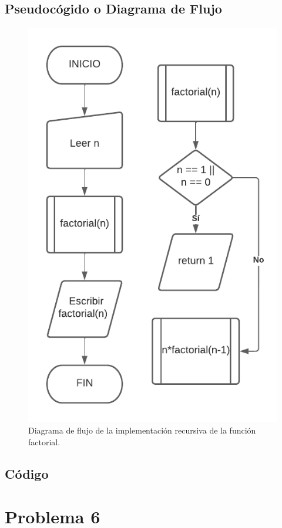 \subsection{Pseudocógido o Diagrama de Flujo}
\begin{figure}[H]
	\centering
	\includegraphics[scale=0.5]{img/problema5.pdf}
	\caption{Diagrama de flujo de la implementación recursiva de la función factorial.}
	\label{DFp5}
\end{figure}


\subsection{Código}


\section{Problema 6}
